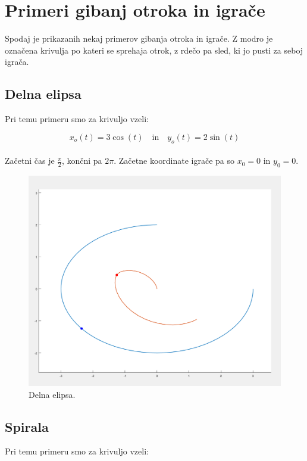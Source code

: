 \documentclass[mat1,reqno]{fmfdelo}
\begin{document}
\newpage

\section{Primeri gibanj otroka in igrače}

Spodaj je prikazanih nekaj primerov gibanja otroka in igrače. Z modro je označena krivulja po kateri se sprehaja otrok, z rdečo pa sled, ki jo pusti za seboj igrača.


\subsection{Delna elipsa} Pri temu primeru smo za krivuljo vzeli:

\begin{equation*}
x_{o}(t) = 3\cos(t) \quad \textrm{in} \quad
y_{o}(t) = 2\sin(t)
\end{equation*}
\\
Začetni čas je $\frac{\pi}{2}$, končni pa $2\pi$. Začetne koordinate igrače pa so $x_{0} = 0$ in $y_{0} = 0$.

\begin{figure}[!h]
\centering
\includegraphics[scale=0.2]{Delna elipsa}\\
Delna elipsa.
\end{figure}


\subsection{Spirala} Pri temu primeru smo za krivuljo vzeli:
\end{document}
